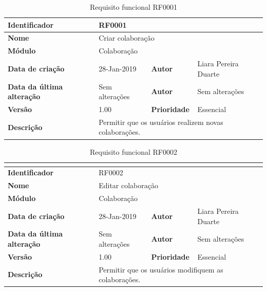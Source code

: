     \begin{table}[H]
        \caption{Requisito funcional RF0001}
        \begin{tabular}{llll}
        \hline
        \multicolumn{1}{|l|}{\textbf{Identificador}} & \multicolumn{3}{l|}{RF0001} \\ \hline
        \multicolumn{1}{|l|}{\textbf{Nome}} & \multicolumn{3}{l|}{Criar colaboração} \\ \hline
        \multicolumn{1}{|l|}{\textbf{Módulo}} & \multicolumn{3}{l|}{Colaboração} \\ \hline
        \multicolumn{1}{|l|}{\textbf{Data de criação}} & \multicolumn{1}{l|}{28-Jan-2019} & \multicolumn{1}{l|}{\textbf{Autor}} & \multicolumn{1}{l|}{Liara Pereira Duarte} \\ \hline
        \multicolumn{1}{|l|}{\textbf{Data da última alteração}} & \multicolumn{1}{l|}{Sem alterações} & \multicolumn{1}{l|}{\textbf{Autor}} & \multicolumn{1}{l|}{Sem alterações} \\ \hline
        \multicolumn{1}{|l|}{\textbf{Versão}} & \multicolumn{1}{l|}{1.00} & \multicolumn{1}{l|}{\textbf{Prioridade}} & \multicolumn{1}{l|}{Essencial} \\ \hline
        \multicolumn{1}{|l|}{\textbf{Descrição}} & \multicolumn{3}{l|}{Permitir que os usuários realizem novas colaborações.} \\ \hline
        \end{tabular}
        \label{tab:RF0001}
    \end{table}
    
    \begin{table}[H]
        \caption{Requisito funcional RF0002}
\begin{tabular}{llll}
    \hline
    \textbf{} & & & \\ \hline
    \multicolumn{1}{|l|}{\textbf{Identificador}} & \multicolumn{3}{l|}{RF0002} \\ \hline
    \multicolumn{1}{|l|}{\textbf{Nome}} & \multicolumn{3}{l|}{Editar colaboração} \\ \hline
    \multicolumn{1}{|l|}{\textbf{Módulo}} & \multicolumn{3}{l|}{Colaboração} \\ \hline
    \multicolumn{1}{|l|}{\textbf{Data de criação}} & \multicolumn{1}{l|}{28-Jan-2019} & \multicolumn{1}{l|}{\textbf{Autor}} & \multicolumn{1}{l|}{Liara Pereira Duarte} \\ \hline
    \multicolumn{1}{|l|}{\textbf{Data da última alteração}} & \multicolumn{1}{l|}{Sem alterações} & \multicolumn{1}{l|}{\textbf{Autor}} & \multicolumn{1}{l|}{Sem alterações} \\ \hline
    \multicolumn{1}{|l|}{\textbf{Versão}} & \multicolumn{1}{l|}{1.00} & \multicolumn{1}{l|}{\textbf{Prioridade}} & \multicolumn{1}{l|}{Essencial} \\ \hline
    \multicolumn{1}{|l|}{\textbf{Descrição}} & \multicolumn{3}{l|}{Permitir que os usuários modifiquem as colaborações.} \\ \hline
    \end{tabular}
    \label{tab:RF0002}
\end{table}
    
